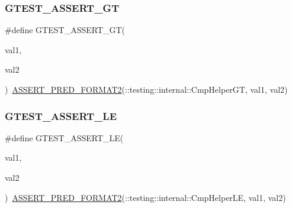 \mbox{\label{googletest-master_2googletest_2include_2gtest_2gtest_8h_a088b9056fd1c1f316b41c22f64deb33a}} 
\subsubsection{\texorpdfstring{GTEST\_ASSERT\_GT}{GTEST\_ASSERT\_GT}}
{\footnotesize\ttfamily \#define G\+T\+E\+S\+T\+\_\+\+A\+S\+S\+E\+R\+T\+\_\+\+GT(\begin{DoxyParamCaption}\item[{}]{val1,  }\item[{}]{val2 }\end{DoxyParamCaption})~\mbox{\hyperlink{_obj__test_2lib_2googletest-release-1_88_81_2googletest_2include_2gtest_2gtest__pred__impl_8h_ac452685a1a98ea3d96eb956a062ee210}{A\+S\+S\+E\+R\+T\+\_\+\+P\+R\+E\+D\+\_\+\+F\+O\+R\+M\+A\+T2}}(\+::testing\+::internal\+::\+Cmp\+Helper\+GT, val1, val2)}

\mbox{\label{googletest-master_2googletest_2include_2gtest_2gtest_8h_abef04dcd4a0259d378de7b3b3ffb6730}} 
\subsubsection{\texorpdfstring{GTEST\_ASSERT\_LE}{GTEST\_ASSERT\_LE}}
{\footnotesize\ttfamily \#define G\+T\+E\+S\+T\+\_\+\+A\+S\+S\+E\+R\+T\+\_\+\+LE(\begin{DoxyParamCaption}\item[{}]{val1,  }\item[{}]{val2 }\end{DoxyParamCaption})~\mbox{\hyperlink{_obj__test_2lib_2googletest-release-1_88_81_2googletest_2include_2gtest_2gtest__pred__impl_8h_ac452685a1a98ea3d96eb956a062ee210}{A\+S\+S\+E\+R\+T\+\_\+\+P\+R\+E\+D\+\_\+\+F\+O\+R\+M\+A\+T2}}(\+::testing\+::internal\+::\+Cmp\+Helper\+LE, val1, val2)}

\mbox{\label{googletest-master_2googletest_2include_2gtest_2gtest_8h_a5a75667e637febd18e5f7d4f3abf55e8}} 
